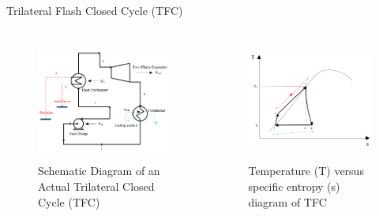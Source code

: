 \begin{frame}{Trilateral Flash Closed Cycle (TFC)}
\begin{columns}
    \begin{figure}[h]
      \centering
      \includegraphics[height=4cm]{images/TLC.png}
      \caption{\scriptsize Schematic Diagram of an Actual Trilateral Closed Cycle (TFC) \cite{smith2014power}}
      \label{fig:tlcschematicdiagram}
   \end{figure}
    \begin{figure}[h]
    \centering
    \includegraphics[height=4cm]{images/tfctsdiagram.png}
    \caption{\scriptsize Temperature (T) versus specific entropy (s) diagram of TFC \cite{smith2014power}}
    \label{fig:tlctsdiagram}
    \end{figure}
\end{columns}
\end{frame}

